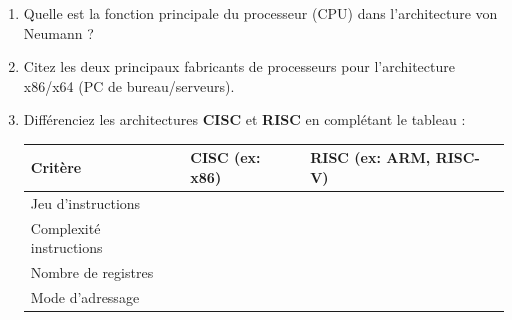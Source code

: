 \documentclass[11pt]{article}
\begin{document}
\begin{exercice}
\begin{enumerate}
    \item Quelle est la fonction principale du processeur (CPU) dans l'architecture von Neumann ?
    \item Citez les deux principaux fabricants de processeurs pour l'architecture x86/x64 (PC de bureau/serveurs).
    \item Différenciez les architectures \textbf{CISC} et \textbf{RISC} en complétant le tableau :
    \begin{tabular}{|l|l|l|}
    \hline
    \textbf{Critère} & \textbf{CISC (ex: x86)} & \textbf{RISC (ex: ARM, RISC-V)} \\
    \hline
    Jeu d'instructions & \underline{\hspace{4cm}} & \underline{\hspace{4cm}} \\
    \hline
    Complexité instructions & \underline{\hspace{4cm}} & \underline{\hspace{4cm}} \\
    \hline
    Nombre de registres & \underline{\hspace{4cm}} & \underline{\hspace{4cm}} \\
    \hline
    Mode d'adressage & \underline{\hspace{4cm}} & \underline{\hspace{4cm}} \\
    \hline
    \end{tabular}
\end{enumerate}
\end{exercice}
\end{document}

